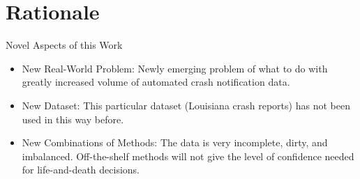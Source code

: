 \section{Rationale}

Novel Aspects of this Work

\begin{itemize}
	\item New Real-World Problem:  Newly emerging problem of what to do with greatly increased volume of automated crash notification data.
	\item New Dataset:  This particular dataset (Louisiana crash reports) has not been used in this way before.
	\item New Combinations of Methods:  The data is very incomplete, dirty, and imbalanced.  Off-the-shelf methods will not give the level of confidence needed for life-and-death decisions.  
\end{itemize}